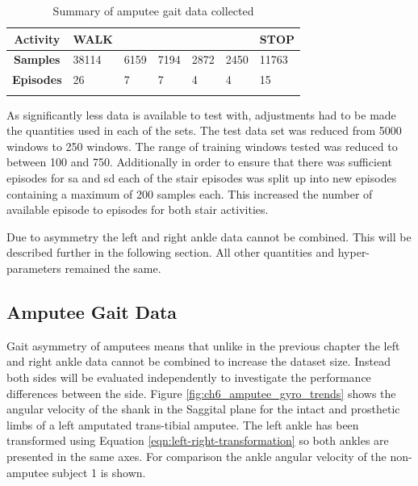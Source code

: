 \begin{table}[hbt]
    \centering
    \caption{Summary of amputee gait data collected}
    \label{tab:summary-of-episode-amputee-data}
    \begin{tabularx}{\textwidth}{c *{6}{Y}}
        \textbf{Activity} & WALK &  &  &  &  & STOP \\
        \hline
        \textbf{Samples} & 38114 & 6159 & 7194 & 2872 & 2450 & 11763 \\
        \textbf{Episodes} & 26 & 7 & 7 & 4 & 4 & 15 \\
         \\
    \end{tabularx}
\end{table}

As significantly less data is available to test with, adjustments had to be made the quantities used in each of the sets. The test data set was reduced from 5000 windows to 250 windows. The range of training windows tested was reduced to between 100 and 750. Additionally in order to ensure that there was sufficient episodes for \acrshort{sa} and \acrshort{sd} each of the stair episodes was split up into new episodes containing a maximum of 200 samples each. This increased the number of available episode to episodes for both stair activities. 

Due to asymmetry the left and right ankle data cannot be combined. This will be described further in the following section. All other quantities and hyper-parameters remained the same.

\subsection{Amputee Gait Data}
Gait asymmetry of amputees means that unlike in the previous chapter the left and right ankle data cannot be combined to increase the dataset size. Instead both sides will be evaluated independently to investigate the performance differences between the side. Figure \ref{fig:ch6_amputee_gyro_trends} shows the angular velocity of the shank in the Saggital plane for the intact and prosthetic limbs of a left amputated trans-tibial amputee. The left ankle has been transformed using Equation \ref{eqn:left-right-transformation} so both ankles are presented in the same axes. For comparison the ankle angular velocity of the non-amputee subject 1 is shown.

